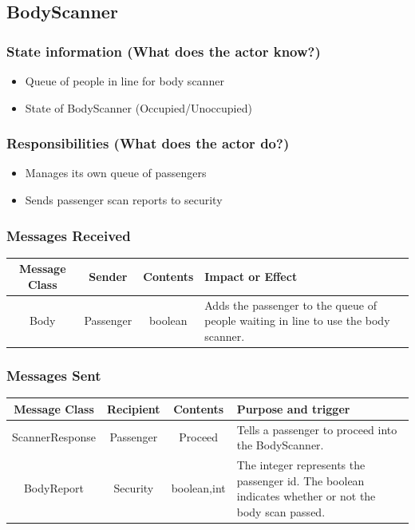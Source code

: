 \documentclass[12pt,letterpaper]{scrartcl}
\begin{document}
\subsection*{BodyScanner}
\subsubsection*{State information (What does the actor know?)}
\begin{itemize}
\item Queue of people in line for body scanner
\item State of BodyScanner (Occupied/Unoccupied)
\end{itemize}

\subsubsection*{Responsibilities (What does the actor do?)}
\begin{itemize}
\item Manages its own queue of passengers
\item Sends passenger scan reports to security
\end{itemize}

\subsubsection*{Messages Received}
\begin{center}
\begin{tabulary}{\textwidth}{|c|c|c|L|}
	\hline
	Message Class & Sender & Contents & Impact or Effect \\
	\hline
	Body & Passenger & boolean & Adds the passenger to the queue of people waiting in line to use the body 
scanner. \\
	\hline
\end{tabulary}
\end{center}

\subsubsection*{Messages Sent}
\begin{center}
\begin{tabulary}{\textwidth}{|c|c|c|L|}
	\hline
	Message Class & Recipient & Contents & Purpose and trigger \\
	\hline
	ScannerResponse & Passenger & Proceed & Tells a passenger to proceed into the BodyScanner. \\
	BodyReport & Security & boolean,int & The integer represents the passenger id. The boolean indicates whether 
or not the body scan passed. \\
	\hline
\end{tabulary}
\end{center}
\end{document}
